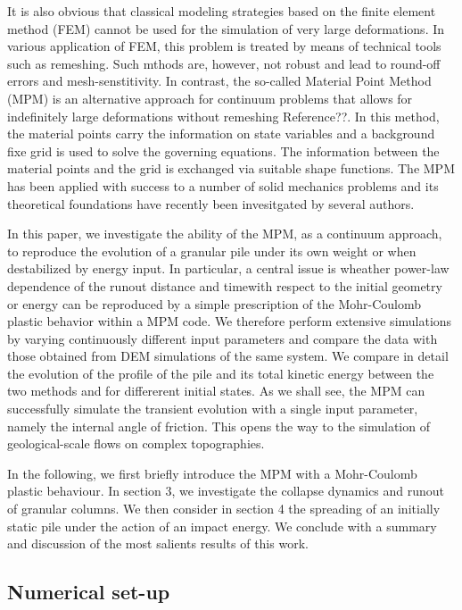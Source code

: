 \documentclass[3p,times,procedia,number]{elsarticle}
\begin{document}
It is also obvious that classical modeling strategies based on the finite
element method (FEM) cannot be used for the simulation of very large
deformations. In various application of FEM, this problem is treated by means
of technical tools such as remeshing. Such mthods are, however, not robust and
lead to round-off errors and mesh-senstitivity. In contrast, the so-called
Material Point Method (MPM) is an alternative approach for continuum problems
that allows for indefinitely large deformations without remeshing
{Reference??}. In this method, the material points carry the information on
state variables and a background fixe grid is used to solve the governing
equations. The information between the material points and the grid is
exchanged via suitable shape functions. The MPM has been applied with success
to a number of solid mechanics problems and its theoretical foundations have
recently been invesitgated by several authors. 

In this paper, we investigate the ability of the MPM, as a continuum
approach, to reproduce the evolution of a granular pile under its own weight or
when destabilized by energy input. In particular, a central issue is wheather
power-law dependence of the runout distance and timewith respect to the initial
geometry or energy can be reproduced by a simple prescription of the
Mohr-Coulomb plastic behavior within a  MPM code. We therefore perform
extensive simulations by varying continuously different input parameters and
compare the data with those obtained from DEM simulations of the same system.
We compare in detail the evolution of the profile of the pile and its total
kinetic energy between the two methods and for differerent initial states. As
we shall see, the MPM can successfully simulate  the transient evolution with a
single input parameter, namely the internal angle of friction. This opens the
way to the simulation of geological-scale flows on complex topographies.  
  
In the following, we first briefly introduce the MPM  with a Mohr-Coulomb
plastic behaviour. In section 3, we investigate the collapse dynamics and
runout of granular columns. We then consider in section 4 the spreading of an
initially static pile under the action of an impact energy. We conclude with a
summary and discussion of the most salients results of this work.   

\subsection{Numerical set-up}
\label{sec:num}
\end{document}
